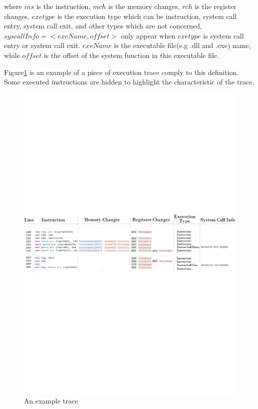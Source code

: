 where $ins$ is the instruction, $mch$ is the memory changes, $rch$ is the register changes, $exetype$ is the execution type which can be instruction, system call entry, system call exit, and other types which are not concerned, $syscallInfo = <exeName, offset>$ only appear when $exetype$ is system call entry or system call exit. $exeName$ is the executable file(e.g .dll and .exe) name, while $offset$ is the offset of the system function in this executable file.

Figure\ref{trace} is an example of a piece of execution trace comply to this definition. Some executed instructions are hidden to highlight the characteristic of the trace. 

\begin{figure}[H]
\centerline{\includegraphics[scale=0.5]{Figures/trace}}
\caption{An example trace }
\label{trace}
\end{figure}

